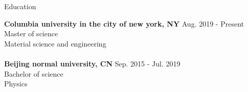 \documentclass{resume} %
\begin{document}

\begin{rSection}{Education}

{\bf Columbia university in the city of new york, NY} \hfill { Aug. 2019 - Present} 
\\ Master of science
\\ Material science and engineering\\
\\
{\bf Beijing normal university, CN} \hfill { Sep. 2015 - Jul. 2019} 
\\ Bachelor of science
\\ Physics

\end{rSection}
\end{document}

